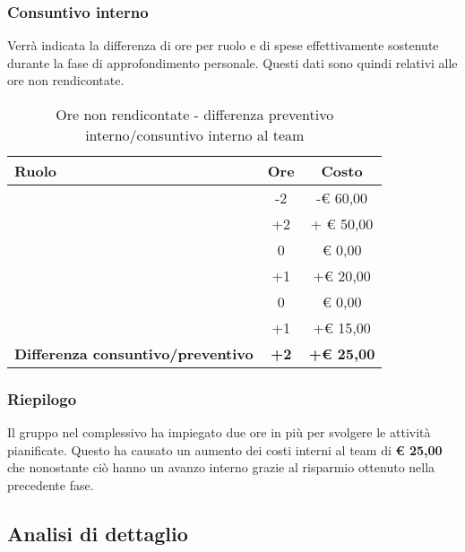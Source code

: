 		\subsubsection{Consuntivo interno} %
		\label{ssub:consuntivo}
		Verrà indicata la differenza di ore per ruolo e di spese effettivamente sostenute durante la fase di approfondimento personale. Questi dati sono quindi relativi alle ore non rendicontate.
		\begin{table}[!h]
			\begin{center}
				\begin{tabularx}{0.75\textwidth}{|X|c|c|}
					\hline
					\textbf{Ruolo} & \textbf{Ore} & \textbf{Costo} \\
					\hline
					\roleProjectManager & -2 & -\euro{} 60,00 \\
					\hline
					\roleAnalyst & +2 & + \euro{} 50,00 \\
					\hline
					\roleDesigner & 0 & \euro{} 0,00 \\
					\hline
					\roleAdministrator & +1  & +\euro{} 20,00 \\
					\hline
					\roleProgrammer & 0 & \euro{} 0,00 \\
					\hline
					\roleVerifier & +1 & +\euro{} 15,00 \\
					\hline
					\textbf{Differenza consuntivo/preventivo} & \textbf{+2} & \textbf{+\euro{} 25,00} \\
					\hline
				\end{tabularx}
			\end{center}
		\caption{Ore non rendicontate - differenza preventivo interno/consuntivo interno al team}
		\end{table}

		\subsubsection{Riepilogo} %
		\label{ssub:riepilogo}
		Il gruppo nel complessivo ha impiegato due ore in più per svolgere le attività pianificate. \newline
		Questo ha causato un aumento dei costi interni al team di \textbf{\euro{} 25,00} che nonostante ciò hanno un avanzo interno grazie al risparmio ottenuto nella precedente fase.


	\newpage
	\subsection{Analisi di dettaglio} %
	\label{sub:analisi_di_dettaglio}
